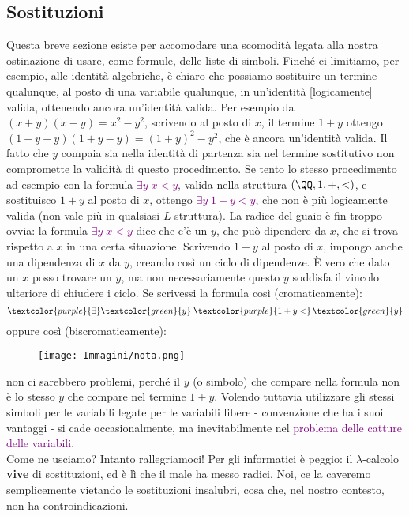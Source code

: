 \subsection{Sostituzioni}
Questa breve sezione esiste per accomodare una scomodità legata alla nostra ostinazione di usare, come formule, delle liste di simboli. Finché ci limitiamo, per esempio, alle identità algebriche,
è chiaro che possiamo sostituire un termine qualunque, al posto di una variabile qualunque, in un'identità [logicamente] valida, ottenendo ancora un'identità valida. Per esempio da $(x+y)(x-y) = x^2 - y^2$, scrivendo al posto di 
$x$, il termine $1+y$ ottengo $(1+y+y)(1+y-y) = (1+y)^2 - y^2$, che è ancora un'identità valida. Il fatto che $y$ compaia sia nella identità di partenza sia nel termine sostitutivo non compromette la validità di questo procedimento.
Se tento lo stesso procedimento ad esempio con la formula \textcolor{purple}{$\exists y \; x < y$}, valida nella struttura $(\QQ,1,+,<)$, e sostituisco $1+y$ al posto di $x$, ottengo \textcolor{purple}{$\exists y \; 1+y < y$}, che non è più logicamente valida (non vale più in qualsiasi $L$-struttura).
La radice del guaio è fin troppo ovvia: la formula \textcolor{purple}{$\exists y \; x < y$} dice che c'è un $y$, che può dipendere da $x$, che si trova rispetto a $x$ in una certa situazione. Scrivendo $1+y$ al posto di $x$, impongo anche una dipendenza di $x$ da $y$, creando così un ciclo di dipendenze.
È vero che dato un $x$ posso trovare un $y$, ma non necessariamente questo $y$ soddisfa il vincolo ulteriore di chiudere i ciclo. Se scrivessi la formula così (cromaticamente):
\[ \textcolor{purple}{\exists}\textcolor{green}{y} \; \textcolor{purple}{1+y <}\, \textcolor{green}{y}
\]
oppure così (biscromaticamente):
\begin{figure}[h]
    \centering
    \texttt{[image: Immagini/nota.png]}
\end{figure}
non ci sarebbero problemi, perché il $y$ (o simbolo) che compare nella formula non è lo stesso $y$ che compare nel termine $1+y$. Volendo tuttavia utilizzare gli stessi simboli per le variabili legate per le variabili libere - convenzione che ha i suoi vantaggi - si cade occasionalmente, ma inevitabilmente nel
\textcolor{purple}{problema delle catture delle variabili}.\\
Come ne usciamo? Intanto rallegriamoci! Per gli informatici è peggio: il $\lambda$-calcolo \textbf{vive} di sostituzioni, ed è lì che il male ha messo radici. Noi, ce la caveremo semplicemente vietando le sostituzioni insalubri, cosa che, nel nostro contesto, non ha controindicazioni.

